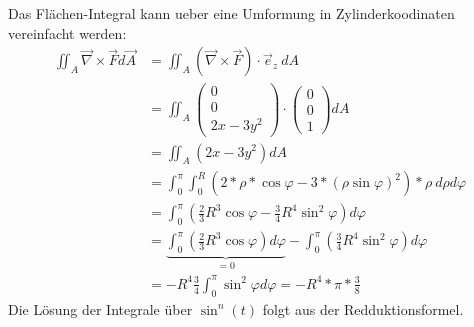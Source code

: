 \documentclass[a4paper]{article}
\begin{document}
Das Flächen-Integral kann ueber eine Umformung in Zylinderkoodinaten vereinfacht werden:
\begin{align*}
	\iint_{A} \vec \nabla \times \vec F d\vec A &= 
	\iint_{A} \left( \vec \nabla \times \vec F\right) \cdot  \vec e_z \ dA \\
	&= \iint_{A}
	\begin{pmatrix} 0 \\ 0 \\ 2x - 3y^2 \end{pmatrix} \cdot
	\begin{pmatrix} 0 \\ 0 \\ 1 \end{pmatrix} dA \\
	&= \iint_{A} \left( 2x - 3y^2 \right) dA \\
	&= \int_0^\pi \int_0^R 
	\left(
		2 * \rho * \cos\varphi - 
		3 * (\rho \sin\varphi)^2
	\right) * \rho \
	d\rho d\varphi \\
	&= \int_0^\pi 
	\left(
		\frac 2 3 R^3 \cos\varphi - 
		\frac 3 4 R^4 \sin^2\varphi
	\right)
	d\varphi \\
	&= 
	\underbrace{\int_0^\pi 
	\left(
		\frac 2 3 R^3 \cos\varphi
	\right)
	d\varphi}_{= 0}
	-
	\int_0^\pi
	\left(
		\frac 3 4 R^4 \sin^2\varphi
	\right)
	d\varphi \\
	&= -R^4 \frac 3 4 \int_0^\pi \sin^2\varphi d\varphi = -R^4 * \pi *
	\frac 3 8
\end{align*}
Die Lösung der Integrale über $\sin^n(t)$ folgt aus der Redduktionsformel.
\end{document}
